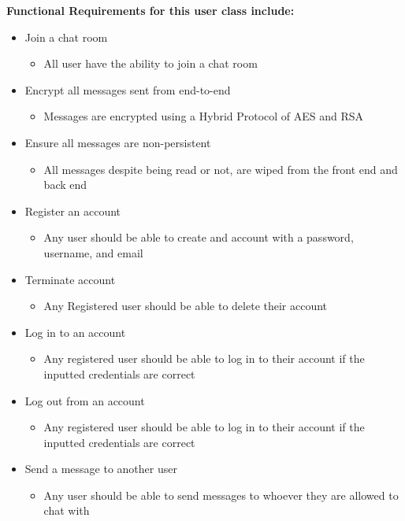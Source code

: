 \documentclass[12pt]{article}
\begin{document}
\textbf{Functional Requirements for this user class include:}
\begin{itemize}
    \item Join a chat room
    \begin{itemize}
        \item All user have the ability to join a chat room 
      \end{itemize}
    \item Encrypt all messages sent from end-to-end
    \begin{itemize}
        \item Messages are encrypted using a Hybrid Protocol of AES and RSA
      \end{itemize}
   \item Ensure all messages are non-persistent 
    \begin{itemize}
        \item All messages despite being read or not, are wiped from the front end and back end
      \end{itemize}
 \item Register an account
    \begin{itemize}
        \item Any user should be able to create and account with a password, username, and email
      \end{itemize}
    \item Terminate account
     \begin{itemize}
        \item Any Registered user should be able to delete their account 
      \end{itemize}
\item Log in to an account 
     \begin{itemize}
        \item Any registered user should be able to log in to their account if the inputted credentials are correct 
      \end{itemize}
\item Log out from an account 
     \begin{itemize}
        \item Any registered user should be able to log in to their account if the inputted credentials are correct
      \end{itemize}
\item Send a message to another user
     \begin{itemize}
        \item Any user should be able to send messages to whoever they are allowed to chat with

\end{itemize}
\end{itemize}
\end{document}

